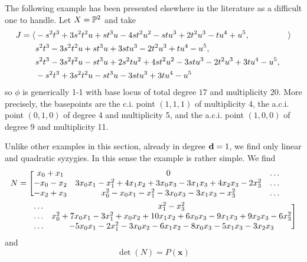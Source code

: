 \documentclass[fleqn,reqno]{amsart}
\begin{document}
\begin{example}[$\mt{ex310}$]
\label{ex310}
The following example has been presented elsewhere in the literature as a difficult one to handle.
Let $X=\mathbb{P}^2$ and take
\begin{align*}
	J=\langle &-s^{2} t^{3}+3 s^{2} t^{2} u+s t^{3} u-4 s t^{2} u^{2}-s t
	      u^{3}+2 t^{2} u^{3}-t u^{4}+u^{5}, &\rangle\\
		  &s^{2} t^{3}-3 s^{2} t^{2} u+s t^{3} u+3 s t
	      u^{3}-2 t^{2} u^{3}+t u^{4}-u^{5},\\
		  &s^{2} t^{3}-3 s^{2} t^{2} u-s t^{3} u+2
	      s^{2} t u^{2}+4 s t^{2} u^{2}-3 s t u^{3}-2 t^{2} u^{3}+3 t u^{4}-u^{5},\\
		  &-s^{2}
	      t^{3}+3 s^{2} t^{2} u-s t^{3} u-3 s t u^{3}+3 t u^{4}-u^{5}
\end{align*}
so $\phi$ is generically 1-1
with base locus of total degree $17$ and multiplicity 20.
More precisely, the basepoints are the c.i. point $(1,1,1)$ of multiplicity $4$,
the a.c.i. point $(0,1,0)$ of degree 4 and multiplicity 5, and
the a.c.i. point $(1,0,0)$ of degree 9 and multiplicity 11.

Unlike other examples in this section,
already in degree $\mathbf d=1$,
we find only linear and quadratic syzygies.
In this sense the example is rather simple.
We find
\begin{align*}
	N=\Bigg[&\bgroup\begin{matrix}{x}_{0}+{x}_{1}&
      0&\ldots\\
      -{x}_{0}-{x}_{2}&
      3 {x}_{0} {x}_{1}-{x}_{1}^{2}+4 {x}_{1} {x}_{2}+3 {x}_{0} {x}_{3}-3 {x}_{1} {x}_{3}+4 {x}_{2} {x}_{3}-2 {x}_{3}^{2}&\ldots\\
      -{x}_{2}+{x}_{3}&
      {x}_{0}^{2}-{x}_{0} {x}_{1}-{x}_{1}^{2}-3 {x}_{0} {x}_{3}-3 {x}_{1} {x}_{3}-{x}_{3}^{2}&\ldots
      \end{matrix}\egroup\\
	  &\bgroup\begin{matrix}
	  \ldots&{x}_{1}^{2}-{x}_{3}^{2}\\
	  \ldots&{x}_{0}^{2}+7 {x}_{0} {x}_{1}-3 {x}_{1}^{2}+{x}_{0} {x}_{2}+10 {x}_{1} {x}_{2}+6 {x}_{0} {x}_{3}-9 {x}_{1} {x}_{3}+9 {x}_{2} {x}_{3}-6 {x}_{3}^{2}\\
	  \ldots&-5 {x}_{0} {x}_{1}-2 {x}_{1}^{2}-3 {x}_{0} {x}_{2}-6 {x}_{1} {x}_{2}-8 {x}_{0} {x}_{3}-5 {x}_{1} {x}_{3}-3 {x}_{2} {x}_{3}
	  \end{matrix}\egroup\Bigg]
\end{align*}
and
\[
	\det(N)=P(\mathbf x)
\]
\end{example}
\end{document}
